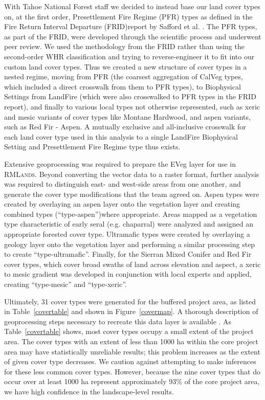 With Tahoe National Forest staff we decided to instead base our land cover types on, at the first order, Presettlement Fire Regime (PFR) types as defined in the Fire Return Interval Departure (FRID)report by Safford et al. . The PFR types, as part of the FRID, were developed through the scientific process and underwent peer review. We used the methodology from the FRID rather than using the second-order WHR classification and trying to reverse-engineer it to fit into our custom land cover types. Thus we created a new structure of cover types in a nested regime, moving from PFR (the coarsest aggregation of CalVeg types, which included a direct crosswalk from them to PFR types), to Biophysical Settings from LandFire (which were also crosswalked to PFR types in the FRID report), and finally to various local types not otherwise represented, such as xeric and mesic variants of cover types like Montane Hardwood, and aspen variants, such as Red Fir - Aspen. A mutually exclusive and all-inclusive crosswalk for each land cover type used in this analysis to a single LandFire Biophysical Setting and Presettlement Fire Regime type thus exists.

Extensive geoprocessing was required to prepare the EVeg layer for use in \textsc{RMLands}. Beyond converting the vector data to a raster format, further analysis was required to distinguish east- and west-side areas from one another, and generate the cover type modifications that the team agreed on. Aspen types were created by overlaying an aspen layer onto the vegetation layer and creating combined types (``type-aspen'')where appropriate. Areas mapped as a vegetation type characteristic of early seral (e.g. chaparral) were analyzed and assigned an appropriate forested cover type. Ultramafic types were created by overlaying a geology layer onto the vegetation layer and performing a similar processing step to create ``type-ultramafic''. Finally, for the Sierran Mixed Conifer and Red Fir cover types, which cover broad swaths of land across elevation and aspect, a xeric to mesic gradient was developed in conjunction with local experts and applied, creating ``type-mesic'' and ``type-xeric''. 

Ultimately, 31 cover types were generated for the buffered project area, as listed in Table~\ref{covertable} and shown in Figure~\ref{covermap}. A thorough description of geoprocessing steps necessary to recreate this data layer is available . As Table~\ref{covertable} shows, most cover types occupy a small extent of the project area. The cover types with an extent of less than 1000 ha within the core project area may have statistically unreliable results; this problem increases as the extent of given cover type decreases. We caution against attempting to make inferences for these less common cover types. However, because the nine cover types that do occur over at least 1000 ha represent approximately 93\% of the core project area, we have high confidence in the landscape-level results.

